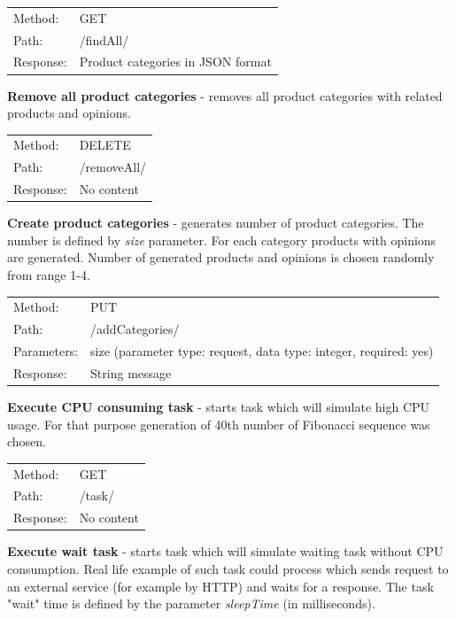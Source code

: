 \documentclass[10pt,a4paper]{article}
\begin{document}
{\renewcommand{\arraystretch}{1}
  \begin{tabular}{ll}
  Method: & GET \\
  Path: & /findAll/ \\
  Response: & Product categories in JSON format  \\
  \end{tabular} \vspace{5mm}
}

\noindent\textbf{Remove all product categories} - removes all product categories with related products and opinions.

{\renewcommand{\arraystretch}{1}
  \begin{tabular}{ll}
  Method: & DELETE \\
  Path: & /removeAll/ \\
  Response: & No content  \\
  \end{tabular} \vspace{5mm}
}
  
\noindent\textbf{Create product categories} - generates number of product categories. The number is defined by \textit{size} parameter. For each category products with opinions are generated. Number of generated products and opinions is chosen randomly from range 1-4. 

{\renewcommand{\arraystretch}{1}
  \begin{tabular}{ll}
  Method: & PUT \\
  Path: & /addCategories/ \\
  Parameters: & size (parameter type: request, data type: integer, required: yes)\\
  Response: & String message  \\
  \end{tabular} \vspace{5mm}
}

\noindent\textbf{Execute CPU consuming task} - starts task which will simulate high CPU usage. For that purpose generation of 40th number of Fibonacci sequence was chosen. 

{\renewcommand{\arraystretch}{1}
  \begin{tabular}{ll}
  Method: & GET \\
  Path: & /task/ \\
  Response: & No content  \\
  \end{tabular} \vspace{2mm}
}

\noindent\textbf{Execute wait task} - starts task which will simulate waiting task without CPU consumption. Real life example of such task could process which sends request to an external service (for example by HTTP) and waits for a response. The task "wait" time is defined by the parameter \textit{sleepTime} (in milliseconds). 
\end{document}
